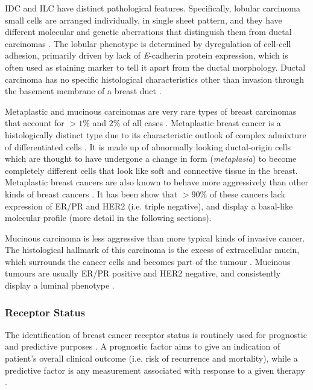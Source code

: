   IDC and ILC have distinct pathological features. Specifically, lobular carcinoma small cells are arranged individually, in single sheet pattern, and they have different molecular and genetic aberrations that distinguish them from ductal carcinomas \cite{weigelt2010molecular}. The lobular phenotype is determined by dyregulation of cell-cell adhesion, primarily driven by lack of \textit{E}-cadherin protein expression, which is often used as staining marker to tell it apart from the ductal morphology\cite{Ciriello2015ComprehensiveCancer, Abdelmessieh2016BreastOverview}. Ductal carcinoma has no specific histological characteristics other than invasion through the basement membrane of a breast duct \cite{Weigelt2008RefinementTypes}. 
   
    Metaplastic and mucinous carcinomas are very rare types of breast carcinomas that account for $>1\%$ and $2\%$ of all cases  \cite{Makki2015DiversityRelevance}. 
    Metaplastic breast cancer is a histologically distinct type due to its characteristic outlook of complex admixture of differentiated cells  \cite{Makki2015DiversityRelevance}. It is made up of abnormally looking ductal-origin cells which are thought to have undergone a change in form (\textit{metaplasia}) to become completely different cells that look like soft and connective tissue in the breast. Metaplastic breast cancers are also known to  behave more aggressively than other kinds of breast cancers \cite{schwartz2013metaplastic}. 
    It has been show that $>90\%$ of these cancers lack expression of ER/PR and HER2 (i.e. triple negative), and display a basal-like molecular profile \cite{Weigelt2010a} (more detail in the following sections).


    Mucinous carcinoma is less aggressive than more typical kinds of invasive cancer. The histological hallmark of this carcinoma is the excess of extracellular mucin, which surrounds the cancer cells and becomes part of the tumour \cite{dumitru2015mucinous}.  Mucinous tumours are usually ER/PR positive and HER2 negative, and consistently display a luminal phenotype \cite{Weigelt2010a}. 
    

   
    \subsubsection{Receptor Status}
    
    The identification of breast cancer receptor status is routinely used for prognostic and predictive  purposes \cite{Zaha2014}. A prognostic factor aims to give an indication of patient's overall clinical outcome (i.e. risk of recurrence and mortality), while a predictive factor is any measurement associated with response to a given therapy \cite{cianfrocca2004prognostic}. 
    
